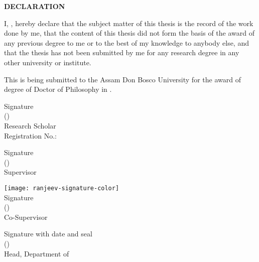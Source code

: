\begin{titlepage}
    \begin{center}
        {\bf \LARGE DECLARATION}
    \end{center}

    \par
    I, \textit{\authorname}, hereby declare that the subject matter of this thesis is the record of the work done by me, that the content of this thesis did not form the basis of the award of any previous degree to me or to the best of my knowledge to anybody else, and that the thesis has not been submitted by me for any research degree in any other university or institute.
    
    \par
    This is being submitted to the Assam Don Bosco University for the award of degree of Doctor of Philosophy in \department.
    
    \vspace*{10mm}
    \begin{flushleft}
        Signature\\
        (\authorname)\\
        Research Scholar\\
        Registration No.: \textit{\registrationNo}
    \end{flushleft}
    
    \vspace*{10mm}
    \begin{flushleft}
        Signature\\
        (\supervisor)\\
        Supervisor
    \end{flushleft}
    
    \vspace*{5mm}
    \begin{flushleft}
    	\texttt{[image: ranjeev-signature-color]}\vspace{-3mm}\\
        Signature\\
        (\cosupervisor)\\
        Co-Supervisor
    \end{flushleft}
    
    \vspace*{10mm}
    \begin{flushleft}
        Signature with date and seal\\
        (\headofdepartment)\\
        Head, Department of \department
    \end{flushleft}

\end{titlepage}